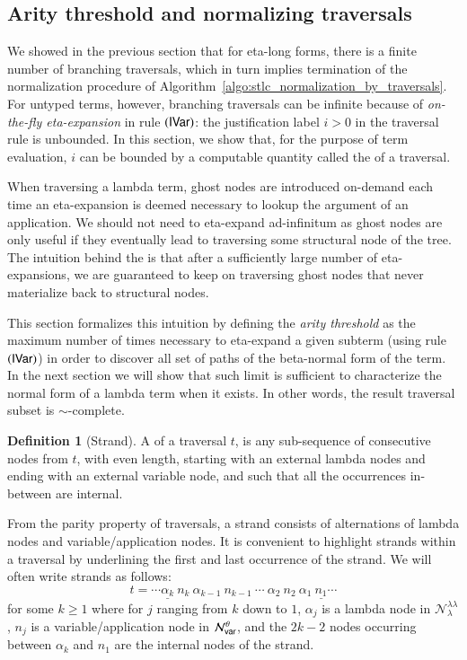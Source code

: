 \documentclass{elsarticle}
\theoremstyle{plain}
\theoremstyle{definition}
\newtheorem{definition}{Definition}[section]
\theoremstyle{remark}
\newcommand\Nodes{\mathcal{N}}%
\newcommand\NodesVar{\Nodes_{\sf var}}%
\newcommand\NodesLmd{\Nodes_\lambda}%
\newcommand{\ghostlmd}{{\lambda\!\!\lambda}}
\newcommand{\ghostvar}{\theta}
\newcommand\ImNodesVar{\NodesVar^\ghostvar}
\newcommand\ImNodesLmd{\NodesLmd^\ghostlmd}
\begin{document}
\subsection{Arity threshold and normalizing traversals}

We showed in the previous section that for eta-long forms, there is a finite number of branching traversals, which in turn implies termination of the normalization procedure of Algorithm~\ref{algo:stlc_normalization_by_traversals}. For untyped terms, however, branching traversals can be infinite because of \emph{on-the-fly eta-expansion} in rule $\mathbf{({\sf IVar})}$: the justification label $i>0$ in the traversal rule is unbounded. In this section, we show that, for the purpose of term evaluation, $i$ can be bounded by a computable quantity called the  of a traversal.

When traversing a lambda term, ghost nodes are introduced on-demand each time an eta-expansion is deemed necessary to lookup the argument of an application.
We should not need to eta-expand ad-infinitum as ghost nodes are only useful if they eventually lead to traversing some structural node of the tree. The intuition behind the  is that after a sufficiently large number of eta-expansions, we are guaranteed to keep on traversing ghost nodes that never materialize back to structural nodes.

This section formalizes this intuition by defining the \emph{arity threshold} as the maximum number of times necessary to eta-expand a given subterm (using rule $\mathbf{({\sf IVar})}$)  in order to discover all set of paths of the beta-normal form of the term. In the next section we will show that such limit is sufficient to characterize the normal form of a lambda term when it exists. In other words, the result traversal subset is $\sim$-complete.

\begin{definition}[Strand]
\label{ref:strand}
A  of a traversal $t$, is any sub-sequence of consecutive nodes from $t$,
with even length, starting with an external lambda nodes and ending with an external variable node, and such that all the occurrences in-between are internal.
\end{definition}

From the parity property of traversals, a strand consists of alternations of lambda nodes and variable/application nodes. It is convenient to highlight strands within a traversal by underlining the first and last occurrence of the strand. We will often write strands as follows:
$$ t = \cdots \underline{\alpha_k}\ n_k\ \alpha_{k-1}\ n_{k-1}\ \cdots\ \alpha_2\ n_2\ \alpha_1\ \underline{n_1} \cdots $$
for some $k\geq 1$ where for $j$ ranging from $k$ down to $1$, $\alpha_j$ is a lambda node in $\ImNodesLmd$, $n_j$ is a variable/application node in $\ImNodesVar$,
and the $2k-2$ nodes occurring  between $\alpha_k$ and $n_1$ are the internal nodes of the strand.
\end{document}
